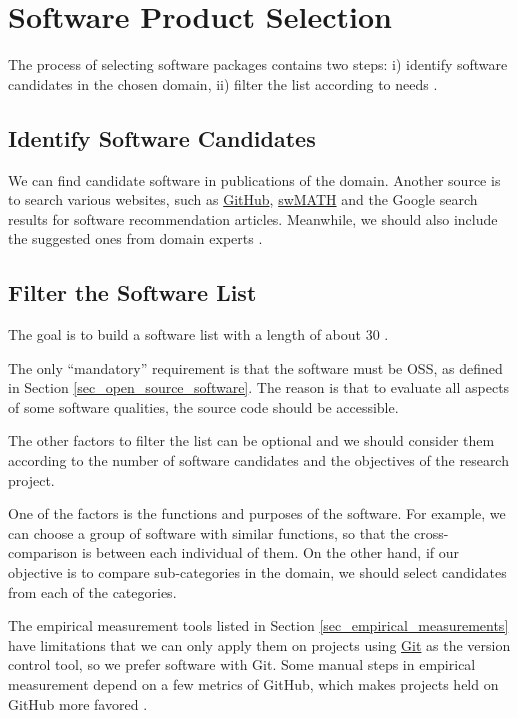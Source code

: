 \section{Software Product Selection}
\label{sec_software_selection}

The process of selecting software packages contains two steps: i) identify software candidates in the chosen domain, ii) filter the list according to needs \cite{SmithEtAl2021}.

\subsection{Identify Software Candidates}
\label{sec_identify_software_candidates}
We can find candidate software in publications of the domain. Another source is to search various websites, such as \hyperlink{https://github.com/}{GitHub}, \hyperlink{https://swmath.org/}{swMATH} and the Google search results for software recommendation articles. Meanwhile, we should also include the suggested ones from domain experts \cite{SmithEtAl2021}.

\subsection{Filter the Software List}
\label{sec_filter_software_list}
The goal is to build a software list with a length of about 30 \cite{SmithEtAl2021}.

The only ``mandatory'' requirement is that the software must be OSS, as defined in Section \ref{sec_open_source_software}. The reason is that to evaluate all aspects of some software qualities, the source code should be accessible.

The other factors to filter the list can be optional and we should consider them according to the number of software candidates and the objectives of the research project.

One of the factors is the functions and purposes of the software. For example, we can choose a group of software with similar functions, so that the cross-comparison is between each individual of them. On the other hand, if our objective is to compare sub-categories in the domain, we should select candidates from each of the categories.

The empirical measurement tools listed in Section \ref{sec_empirical_measurements} have limitations that we can only apply them on projects using \hyperlink{https://git-scm.com/}{Git} as the version control tool, so we prefer software with Git. Some manual steps in empirical measurement depend on a few metrics of GitHub, which makes projects held on GitHub more favored \cite{SmithEtAl2021}.

